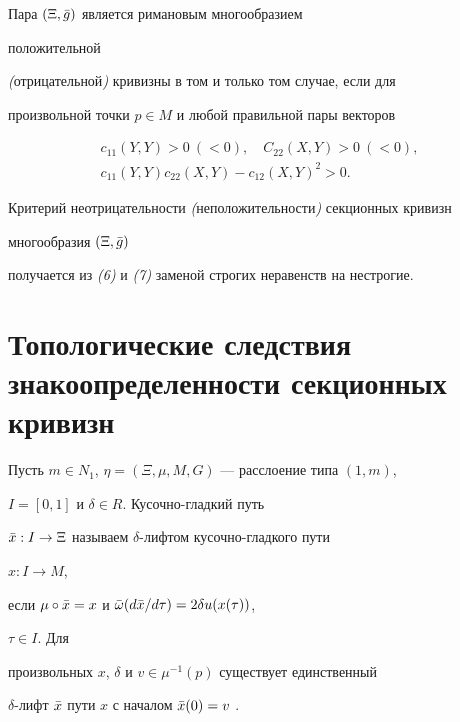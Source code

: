 \begin{thm} Пара $(\Xi,\Bar g)$ является римановым многообразием 


положительной 


{\em (}отрицательной{\em )} кривизны в том и только том случае, если для 


произвольной точки $p\in M$ и любой правильной пары векторов 


\begin{gather} 


c_{11}(Y,Y)>0 \ (<0),\quad C_{22}(X,Y)>0 \ (<0),\\ 


c_{11}(Y,Y)c_{22}(X,Y)-c_{12}(X,Y)^2>0. 


\end{gather} 


Критерий неотрицательности {\em (}неположительности{\em )} секционных кривизн 


многообразия $(\Xi,\Bar g)$


получается из {\em (6)} и {\em (7)} заменой строгих неравенств на нестрогие. 


\end{thm} 


 


\section{Топологические следствия\protect\\ 


знакоопределенности секционных кривизн} 


 


Пусть $m\in N_1$, $\eta=(\Xi,\mu,M,G)$ --- расслоение типа $(1,m)$, 


$I=[0,1]$ и $\delta\in R$. Кусочно-гладкий путь 


$\Bar x:I\to\Xi$ называем $\delta$-лифтом кусочно-гладкого пути 


$x:I\to M$, 


если $\mu\circ\Bar x=x$ и $\Bar\omega(d\Bar x/d\tau)=2\delta u(x(\tau))$, 


$\tau\in I$. Для 


произвольных $x$, $\delta$ и $v\in\mu^{-1}(p)$ существует единственный 


$\delta$-лифт $\Bar x$ пути $x$ с началом $\Bar x(0)=v$ \cite{Yak}. 


 


